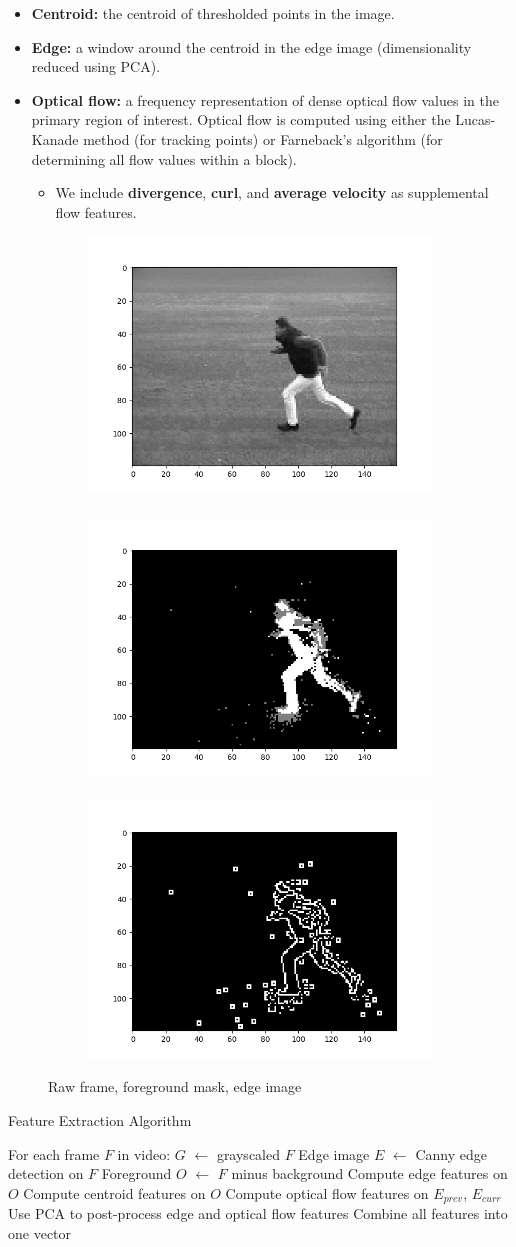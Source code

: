 \documentclass{article}
\begin{document}
\begin{itemize}
    \item \textbf{Centroid:} the centroid of thresholded points in the image.
    \item \textbf{Edge:} a window around the centroid in the edge image (dimensionality reduced using PCA).
    \item \textbf{Optical flow:} a frequency representation of dense optical flow values in the primary region of interest. Optical flow is computed using either the Lucas-Kanade method (for tracking points) or Farneback's algorithm (for determining all flow values within a block).
    \begin{itemize}
        \item We include \textbf{divergence}, \textbf{curl}, and \textbf{average velocity} as supplemental flow features.
    \end{itemize}
\end{itemize}

\begin{figure}[!b]
\centering
\begin{subfigure}[t]{\columnwidth}
\centering
\includegraphics[width=0.3\columnwidth]{frame_gray_1}~
\includegraphics[width=0.3\columnwidth]{fg_mask_1}~
\includegraphics[width=0.3\columnwidth]{edges_1}
\end{subfigure}
\caption{Raw frame, foreground mask, edge image}
\label{fig:images}
\end{figure}

\begin{algorithm}
\caption{Feature Extraction Algorithm}
\begin{algorithmic}[1]
\State For each frame $F$ in video:
    \State \indent $G$ $\leftarrow$ grayscaled $F$
    \State \indent Edge image $E$ $\leftarrow$ Canny edge detection on $F$
    \State \indent Foreground $O$ $\leftarrow$ $F$ minus background
    \State \indent Compute edge features on $O$
    \State \indent Compute centroid features on $O$
    \State \indent Compute optical flow features on $E_{prev}$, $E_{curr}$
\State Use PCA to post-process edge and optical flow features
\State Combine all features into one vector
\end{algorithmic}
\end{algorithm}
\end{document}
